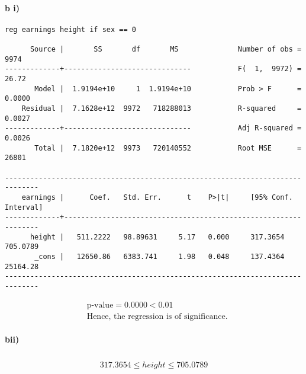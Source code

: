 \documentclass[letterpaper,12pt,titlepage,oneside,final]{book}
\begin{document}
\paragraph{b i)}
\begin{verbatim}
reg earnings height if sex == 0

      Source |       SS       df       MS              Number of obs =    9974
-------------+------------------------------           F(  1,  9972) =   26.72
       Model |  1.9194e+10     1  1.9194e+10           Prob > F      =  0.0000
    Residual |  7.1628e+12  9972   718288013           R-squared     =  0.0027
-------------+------------------------------           Adj R-squared =  0.0026
       Total |  7.1820e+12  9973   720140552           Root MSE      =   26801

------------------------------------------------------------------------------
    earnings |      Coef.   Std. Err.      t    P>|t|     [95% Conf. Interval]
-------------+----------------------------------------------------------------
      height |   511.2222   98.89631     5.17   0.000     317.3654    705.0789
       _cons |   12650.86   6383.741     1.98   0.048     137.4364    25164.28
------------------------------------------------------------------------------

\end{verbatim}

\begin{align*}
&\text{p-value} =  0.0000 < 0.01\\
&\text{Hence, the regression is of significance.}
\end{align*}

\paragraph{bii)}
\begin{align*}
317.3654 \leq \widehat{height} \leq 705.0789
\end{align*}
\end{document}
